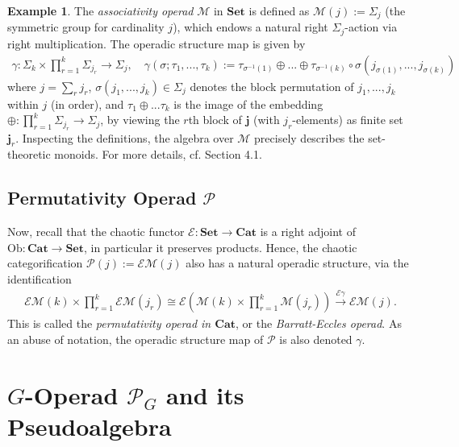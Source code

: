 \documentclass[openany, amssymb, psamsfonts]{amsart}
\theoremstyle{definition}
\newtheorem{exmp}{Example}[section]
\numberwithin{equation}{section}
\newcommand{\Cat}{\mathbf{Cat}} %
\newcommand{\Sets}{\mathbf{Set}} %
\newcommand{\cP}{\mathscr{P}} %
\newcommand{\M}{\mathscr{M}} %
\newcommand{\Ob}{\mathrm{Ob}}%
\begin{document}
\begin{exmp}
    The \emph{associativity operad} $\M$ in $\Sets$ is defined as $\M(j):=\Sigma_j$ (the symmetric group for cardinality $j$), which endows a natural right $\Sigma_j$-action via right multiplication. The operadic structure map is given by 
    \begin{align}
        \gamma:\Sigma_k\times\prod_{r=1}^k\Sigma_{j_r}\rightarrow\Sigma_j,\quad \gamma(\sigma;\tau_1,...,\tau_k):= \tau_{\sigma^{-1}(1)}\oplus...\oplus\tau_{\sigma^{-1}(k)}\circ \sigma(j_{\sigma(1)},...,j_{\sigma(k)})
    \end{align}
    where $j=\sum_r j_r$, $\sigma(j_1,...,j_k)\in \Sigma_j$ denotes the block permutation of $j_1,...,j_k$ within $j$ (in order), and $\tau_1\oplus ... \tau_{k}$ is the image of the embedding $\oplus:\prod_{r=1}^k\Sigma_{j_r}\rightarrow\Sigma_j$, by viewing the $r$th block of $\mathbf{j}$ (with $j_r$-elements) as finite set $\mathbf{j}_r$. Inspecting the definitions, the algebra over $\M$ precisely describes the set-theoretic monoids. For more details, cf.  \cite{GM17} Section 4.1.
\end{exmp}

\subsection{Permutativity Operad $\cP$} \label{sub_perm_operad}
Now, recall that the chaotic functor $\mathscr{E}:\Sets\rightarrow\Cat$ is a right adjoint of $\Ob:\Cat\rightarrow\Sets$, in particular it preserves products. Hence, the chaotic categorification $\cP(j):= \mathscr{E}\M(j)$ also has a natural operadic structure, via the identification
\begin{align}
    \mathscr{E}\M(k)\times \prod_{r=1}^k \mathscr{E}\M(j_r)\cong \mathscr{E}\left(\M(k)\times\prod_{r=1}^k\M(j_r)\right) \xrightarrow{\mathscr{E}\gamma}\mathscr{E}\M(j).
\end{align}
This is called the \emph{permutativity operad in $\Cat$}, or the \emph{Barratt-Eccles operad}. As an abuse of notation, the operadic structure map of $\cP$ is also denoted $\gamma$.

\section{$G$-Operad $\cP_G$ and its Pseudoalgebra}\label{sec_perm_G}
\end{document}
